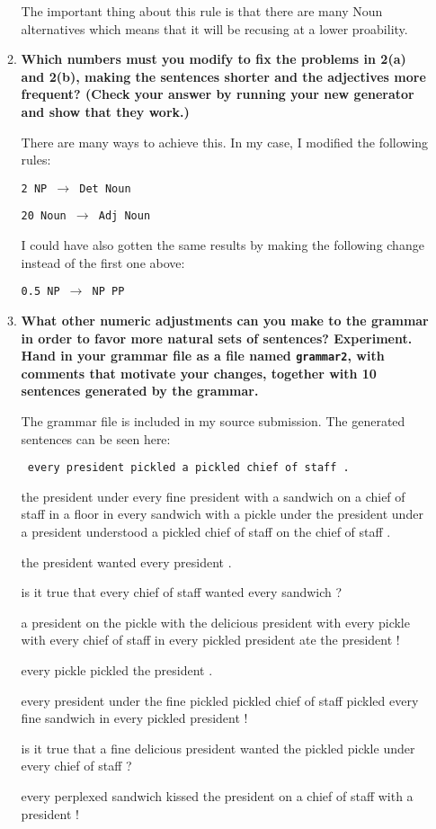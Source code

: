\documentclass[10pt]{article}
\begin{document}
\begin{enumerate}
\begin{enumerate}
The important thing about this rule is that there are many Noun alternatives which means that it will be recusing at a lower proability.

\item {\bf Which numbers must you modify to fix the problems in 2(a) and
    2(b), making the sentences shorter and the adjectives more
    frequent? (Check your answer by running your new generator and
    show that they work.)}

There are many ways to achieve this. In my case, I modified the following rules:

{\tt 2 NP $\rightarrow$ Det Noun}

{\tt 20 Noun $\rightarrow$ Adj Noun}

I could have also gotten the same results by making the following change instead of the first one above:

{\tt 0.5 NP $\rightarrow$ NP PP}

\item {\bf What other numeric adjustments can you make to the grammar in
  order to favor more natural sets of sentences? Experiment. Hand in
  your grammar file as a file named \verb+grammar2+, with comments that
  motivate your changes, together with 10 sentences generated by the
  grammar.}

The grammar file is included in my source submission. The generated sentences can be seen here:

{\tt
every president pickled a pickled chief of staff .

the president under every fine president with a sandwich on a chief of staff in a floor in every sandwich with a pickle under the president under a president understood a pickled chief of staff on the chief of staff .

the president wanted every president .

is it true that every chief of staff wanted every sandwich ?

a president on the pickle with the delicious president with every pickle with every chief of staff in every pickled president ate the president !

every pickle pickled the president .

every president under the fine pickled pickled chief of staff pickled every fine sandwich in every pickled president !

is it true that a fine delicious president wanted the pickled pickle under every chief of staff ?

every perplexed sandwich kissed the president on a chief of staff with a president !

}
\end{enumerate}
\end{enumerate}
\end{document}
